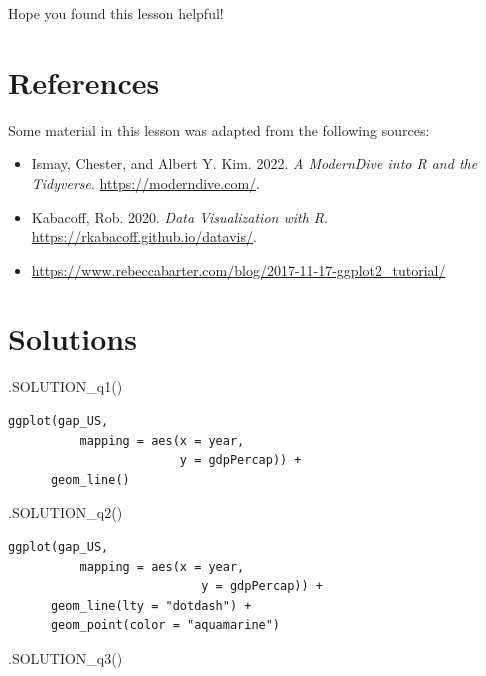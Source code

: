\documentclass[
  letterpaper,
  DIV=11,
  numbers=noendperiod]{scrreprt}
\newenvironment{Shaded}{\begin{snugshade}}{\end{snugshade}}
\newcommand{\FunctionTok}[1]{\textcolor[rgb]{0.28,0.35,0.67}{#1}}
\newcommand{\NormalTok}[1]{\textcolor[rgb]{0.00,0.23,0.31}{#1}}
\providecommand{\tightlist}{%
  \setlength{\itemsep}{0pt}\setlength{\parskip}{0pt}}\usepackage{longtable,booktabs,array}
\begin{document}
Hope you found this lesson helpful!

\section*{References}\label{references-14}


Some material in this lesson was adapted from the following sources:

\begin{itemize}
\tightlist
\item
  Ismay, Chester, and Albert Y. Kim. 2022. \emph{A ModernDive into R and
  the Tidyverse}. \url{https://moderndive.com/}.
\item
  Kabacoff, Rob. 2020. \emph{Data Visualization with R}.
  \url{https://rkabacoff.github.io/datavis/}.
\item
  \url{https://www.rebeccabarter.com/blog/2017-11-17-ggplot2_tutorial/}
\end{itemize}

\section{Solutions}\label{solutions-11}

\begin{Shaded}
\begin{Highlighting}[]
\FunctionTok{.SOLUTION\_q1}\NormalTok{()}
\end{Highlighting}
\end{Shaded}

\begin{verbatim}
ggplot(gap_US, 
          mapping = aes(x = year, 
                        y = gdpPercap)) +
      geom_line()
\end{verbatim}

\begin{Shaded}
\begin{Highlighting}[]
\FunctionTok{.SOLUTION\_q2}\NormalTok{()}
\end{Highlighting}
\end{Shaded}

\begin{verbatim}
ggplot(gap_US, 
          mapping = aes(x = year, 
                           y = gdpPercap)) +
      geom_line(lty = "dotdash") +
      geom_point(color = "aquamarine")
\end{verbatim}

\begin{Shaded}
\begin{Highlighting}[]
\FunctionTok{.SOLUTION\_q3}\NormalTok{()}
\end{Highlighting}
\end{Shaded}
\end{document}
